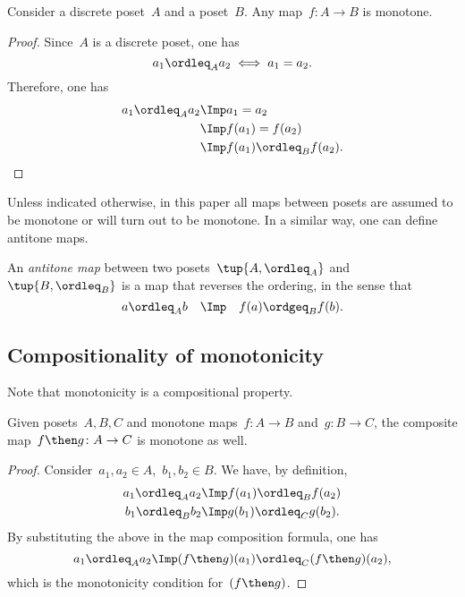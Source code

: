 \begin{lemma}
Consider a discrete poset~$A$ and a poset~$B$. Any map~$f\colon A\to B$ is monotone.
\end{lemma}
\begin{proof}
Since~$A$ is a discrete poset, one has
\begin{equation}
    a_1\ordleq_A a_2 \iff a_1=a_2.
\end{equation}
Therefore, one has
\begin{equation}
\begin{aligned}
    a_1\ordleq_A a_2 &\Imp a_1=a_2\\
    &\Imp f(a_1)=f(a_2)\\
    &\Imp f(a_1)\ordleq_B f(a_2).
\end{aligned}
\end{equation}
\end{proof}
Unless indicated otherwise, in this paper all maps between posets are assumed to be monotone or will turn out to be monotone. In a similar way, one can define antitone maps.
\begin{definition}
An \emph{antitone map} between two posets~$\tup{A, \ordleq_A}$ and~$\tup{B, \ordleq_B}$ is a map that reverses the ordering, in the sense that 
\begin{equation}
 a \ordleq_A b \quad \Imp \quad f(a) \ordgeq_B f(b).
\end{equation}
\end{definition}


\subsection{Compositionality of monotonicity}
Note that monotonicity is a compositional property.
\begin{lemma}
Given  posets~$A, B, C$ and monotone maps~$f\colon A \to B$ and~$g\colon B \to C$, the composite map~$f\then g\colon  A \to C$ is
monotone as well.
\end{lemma}
\begin{proof}
Consider~$a_1,a_2 \in A$,~$b_1,b_2\in B$. We have, by definition, 
\begin{equation}
\begin{aligned}
        a_1\ordleq_A a_2 &\Imp f(a_1)\ordleq_B f(a_2)\\ 
        b_1\ordleq_B b_2 &\Imp g(b_1)\ordleq_C g(b_2).
\end{aligned}
\end{equation}
By substituting the above in the map composition formula, one has
\begin{equation}
    a_1\ordleq_A a_2 \Imp (f\then g)(a_1) \ordleq_C (f\then g)(a_2),
\end{equation}
which is the monotonicity condition for~$(f\then g)$.
\end{proof}


